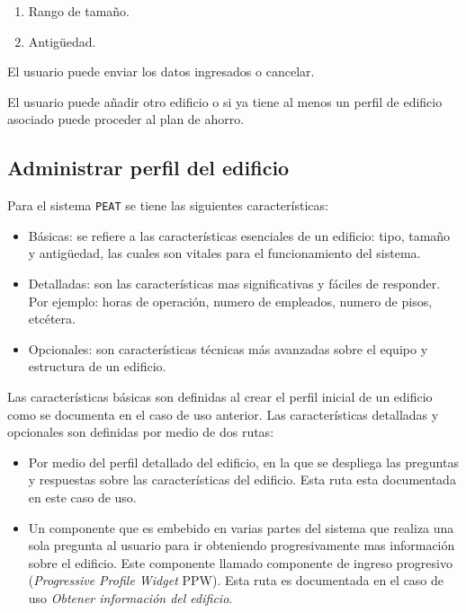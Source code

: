 \begin{usecase}
{\begin{enumerate}
    \item Rango de tamaño.
    \item Antigüedad.
    \end{enumerate}
  \item El usuario puede enviar los datos ingresados o cancelar.
  \item El usuario puede añadir otro edificio o si ya tiene al menos un
    perfil de edificio asociado puede proceder al plan de ahorro.
  }
\end{usecase}


\subsection{Administrar perfil del edificio}

Para el sistema \texttt{PEAT} se tiene las siguientes características:
\begin{itemize}
\item Básicas: se refiere a las características esenciales de un edificio: tipo,
  tamaño y antigüedad, las cuales son vitales para el funcionamiento del sistema.
\item Detalladas: son las características mas significativas y fáciles de
  responder. Por ejemplo: horas de operación, numero de empleados, numero
  de pisos, etcétera.
\item Opcionales: son características técnicas más avanzadas sobre el equipo
  y estructura de un edificio.
\end{itemize}

Las características básicas son definidas al crear el perfil inicial de un
edificio como se documenta en el caso de uso anterior. Las características
detalladas y opcionales son definidas por medio de dos rutas:

\begin{itemize}
\item Por medio del perfil detallado del edificio, en la que se despliega
  las preguntas y respuestas sobre las características del edificio.
  Esta ruta esta documentada en este caso de uso.
\item Un componente que es embebido en varias partes del sistema
  que realiza una sola pregunta al usuario para ir obteniendo progresivamente
  mas información sobre el edificio. Este componente llamado componente
  de ingreso progresivo (\textit{Progressive Profile Widget} PPW).
  Esta ruta es documentada en el caso de uso \textit{Obtener información
    del edificio}.
\end{itemize}

